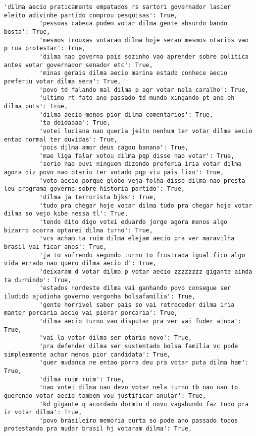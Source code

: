 \documentclass[11pt]{article}
\begin{document}
\begin{Verbatim}[commandchars=\\\{\}]
          'dilma aecio praticamente empatados rs sartori governador lasier eleito adivinhe partido comprou pesquisas': True,
          'pessoas cabeca podem votar dilma gente absurdo bando bosta': True,
          'mesmos trouxas votaram dilma hoje serao mesmos otarios vao p rua protestar': True,
          'dilma nao governa pais sozinho vao aprender sobre politica antes votar governador senador etc': True,
          'minas gerais dilma aecio marina estado conhece aecio preferiu votar dilma sera': True,
          'povo td falando mal dilma p agr votar nela caralho': True,
          'ultimo rt fato ano passado td mundo xingando pt ano eh dilma puts': True,
          'dilma aecio menos pior dilma comentarios': True,
          'ta doidaaaa': True,
          'votei luciana nao queria jeito nenhum ter votar dilma aecio entao normal ter duvidas': True,
          'pois dilma amor deus cagou banana': True,
          'mae liga falar votou dilma pqp disse nao votar': True,
          'serio nao ouvi ninguem dizendo preferia iria votar dilma agora diz povo nao otario ter votado pqp viu pais lixo': True,
          'voto aecio porque globo veja folha disse dilma nao presta leu programa governo sobre historia partido': True,
          'dilma ja terrorista bjks': True,
          'tudo pra chegar hoje votar dilma tudo pra chegar hoje votar dilma so vejo kibe nessa tl': True,
          'tendo dito digo votei eduardo jorge agora menos algo bizarro ocorra optarei dilma turno': True,
          'vcs acham ta ruim dilma elejam aecio pra ver maravilha brasil vai ficar anos': True,
          'ja to sofrendo segundo turno to frustrada igual fico algo vida errado nao quero dilma aecio d': True,
          'deixaram d votar dilma p votar aecio zzzzzzzz gigante ainda ta durmindo': True,
          'estados nordeste dilma vai ganhando povo consegue ser iludido ajudinha governo vergonha bolsafamilia': True,
          'gente horrivel saber pais so vai retroceder dilma iria manter porcaria aecio vai piorar porcaria': True,
          'dilma aecio turno vao disputar pra ver vai fuder ainda': True,
          'vai la votar dilma ser otario novo': True,
          'pra defender dilma ser sustentado bolsa familia vc pode simplesmente achar menos pior candidata': True,
          'quer mudanca ne entao porra deu pra votar puta dilma ham': True,
          'dilma ruim ruim': True,
          'nao votei dilma nao devo votar nela turno tb nao nao to querendo votar aecio tambem vou justificar anular': True,
          'kd gigante q acordado dormiu d novo vagabundo faz tudo pra ir votar dilma': True,
          'povo brasileiro memoria curta so pode ano passado todos protestando pra mudar brasil hj votaram dilma': True,

\end{Verbatim}
\end{document}
